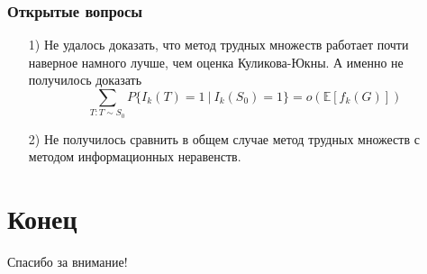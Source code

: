 \documentclass[utf8]{beamer}
\begin{document}
	\begin{frame}
		\frametitle{Открытые вопросы}
		\begin{itemize}
		    \item[1)] Не удалось доказать, что метод трудных множеств работает почти наверное намного 
		    лучше, чем оценка Куликова-Юкны. А именно не получилось доказать
		    $$\sum\limits_{T:T\sim S_0}P\{I_k(T) = 1\ |\ I_k(S_0) = 1\} = o(\mathbb{E}[f_k(G)])$$
		    
		    \item[2)] Не получилось сравнить в общем случае метод трудных множеств с методом информационных неравенств.
		\end{itemize}
	\end{frame}
	
	\section{Конец}
	\begin{frame}
	    \centering \Large{Спасибо за внимание!}
	\end{frame}
	
\end{document}
